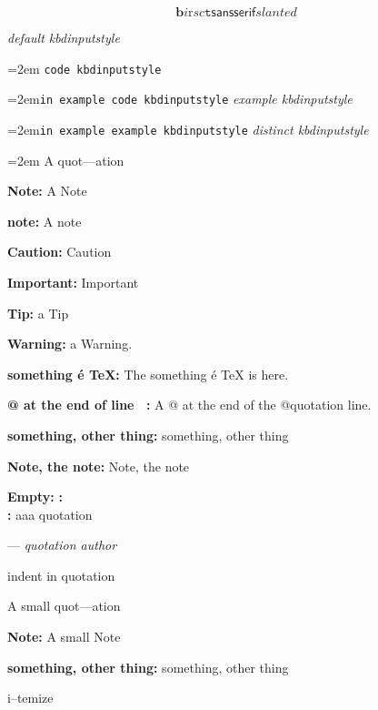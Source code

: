 \documentclass{book}
\begin{document}
\begin{titlepage}
$$
\mathbf{b} \mathit{i} \mathrm{r} sc \mathtt{t} \mathsf{sansserif} slanted
$$

{\ttfamily\textsl{default kbdinputstyle}}
\par\begingroup\obeylines\obeyspaces\frenchspacing\leftskip=2em\relax\parskip=0pt\relax{}
\endgroup{}
\texttt{code kbdinputstyle}
\par\begingroup\obeylines\obeyspaces\frenchspacing\leftskip=2em\relax\parskip=0pt\relax\ttfamily{}\texttt{in example code kbdinputstyle}
\endgroup{}
{\ttfamily\textsl{example kbdinputstyle}}
\par\begingroup\obeylines\obeyspaces\frenchspacing\leftskip=2em\relax\parskip=0pt\relax\ttfamily{}\texttt{in example example kbdinputstyle}
\endgroup{}
{\ttfamily\textsl{distinct kbdinputstyle}}
\par\begingroup\obeylines\obeyspaces\frenchspacing\leftskip=2em\relax\parskip=0pt\relax{}
\endgroup{}
A quot---ation

\textbf{Note:} A Note

\textbf{note:} A note

\textbf{Caution:} Caution

\textbf{Important:} Important

\textbf{Tip:} a Tip

\textbf{Warning:} a Warning.

\textbf{something \'{e} \TeX{}:} The something \'{e} \TeX{} is here.

\textbf{@ at the end of line \ {}:} A @ at the end of the @quotation line.

\textbf{something, other thing:} something, other thing

\textbf{Note, the note:} Note, the note


\textbf{Empty:} 
\textbf{:} 
\textbf{\leavevmode{}\\:} 
aaa quotation
\begin{center}
--- \emph{quotation author}
\end{center}

indent in quotation

A small quot---ation

\textbf{Note:} A small Note

\textbf{something, other thing:} something, other thing

\textbullet{} 

i--temize


\end{titlepage}
\end{document}
